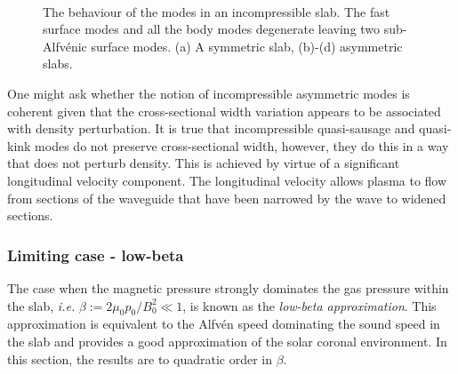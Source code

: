 \documentclass[12pt,draft]{../style-files/ociamthesis}
\begin{document}
\begin{figure}
	\centering
	 \\
	\caption{The behaviour of the modes in an incompressible slab. The fast surface modes and all the body modes degenerate leaving two sub-Alfv\'{e}nic surface modes. (a) A symmetric slab, (b)-(d) asymmetric slabs.}
\end{figure}

One might ask whether the notion of incompressible asymmetric modes is coherent given that the cross-sectional width variation appears to be associated with density perturbation. It is true that incompressible quasi-sausage and quasi-kink modes do not preserve cross-sectional width, however, they do this in a way that does not perturb density. This is achieved by virtue of a significant longitudinal velocity component. The longitudinal velocity allows plasma to flow from sections of the waveguide that have been narrowed by the wave to widened sections.


\subsubsection{Limiting case - low-beta} \label{sec: zero-beta}

The case when the magnetic pressure strongly dominates the gas pressure within the slab, \textit{i.e.} $\beta := 2\mu_0{p_0}/B_0^2 \ll 1$, is known as the \textit{low-beta approximation}. This approximation is equivalent to the Alfv\'{e}n speed dominating the sound speed in the slab and provides a good approximation of the solar coronal environment. In this section, the results are to quadratic order in $\beta$.
\end{document}

